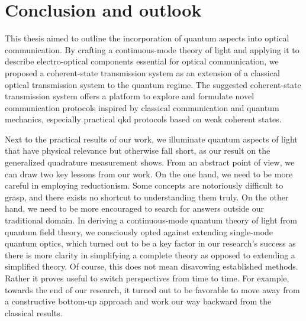 \chapter*{Conclusion and outlook}

This thesis aimed to outline the incorporation of quantum aspects into optical communication.
By crafting a continuous-mode theory of light and applying it to describe electro-optical components essential for optical communication, we proposed a coherent-state transmission system as an extension of a classical optical transmission system to the quantum regime.
The suggested coherent-state transmission system offers a platform to explore and formulate novel communication protocols inspired by classical communication and quantum mechanics, especially practical \gls{qkd} protocols based on weak coherent states.

Next to the practical results of our work, we illuminate quantum aspects of light that have physical relevance but otherwise fall short, as our result on the generalized quadrature measurement shows.
From an abstract point of view, we can draw two key lessons from our work.
On the one hand, we need to be more careful in employing reductionism.
Some concepts are notoriously difficult to grasp, and there exists no shortcut to understanding them truly.
On the other hand, we need to be more encouraged to search for answers outside our traditional domain.
In deriving a continuous-mode quantum theory of light from quantum field theory, we consciously opted against extending single-mode quantum optics, which turned out to be a key factor in our research's success as there is more clarity in simplifying a complete theory as opposed to extending a simplified theory.
Of course, this does not mean disavowing established methods.
Rather it proves useful to switch perspectives from time to time.
For example, towards the end of our research, it turned out to be favorable to move away from a constructive bottom-up approach and work our way backward from the classical results.


